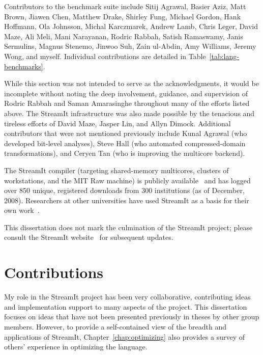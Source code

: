 Contributors to the benchmark suite include Sitij Agrawal, Basier
Aziz, Matt Brown, Jiawen Chen, Matthew Drake, Shirley Fung, Michael
Gordon, Hank Hoffmann, Ola Johnsson, Michal Karczmarek, Andrew Lamb,
Chris Leger, David Maze, Ali Meli, Mani Narayanan, Rodric Rabbah,
Satish Ramaswamy, Janis Sermulins, Magnus Stenemo, Jinwoo Suh, Zain
ul-Abdin, Amy Williams, Jeremy Wong, and myself.  Individual
contributions are detailed in Table~\ref{tab:lang-benchmarks}.


While this section was not intended to serve as the acknowledgments,
it would be incomplete without noting the deep involvement, guidance,
and supervision of Rodric Rabbah and Saman Amarasinghe throughout many
of the efforts listed above.  The StreamIt infrastructure was also
made possible by the tenacious and tireless efforts of David Maze,
Jasper Lin, and Allyn Dimock.  Additional contributors that were not
mentioned previously include Kunal Agrawal (who developed bit-level
analyses), Steve Hall (who automated compressed-domain
transformations), and Ceryen Tan (who is improving the multicore
backend).

The StreamIt compiler (targeting shared-memory multicores, clusters of
workstations, and the MIT Raw machine) is publicly
available~\cite{streamitweb} and has logged over 850 unique,
registered downloads from 300 institutions (as of December, 2008).
Researchers at other universities have used StreamIt as a basis for
their own
work~\cite{mani-permutations,duca-thesis,bit-streaming,ola-techrep,andersson_model_07,won-thesis}.

This dissertation does not mark the culmination of the StreamIt
project; please consult the StreamIt website~\cite{streamitweb} for
subsequent updates.

\section{Contributions}

My role in the StreamIt project has been very collaborative,
contributing ideas and implementation support to many aspects of the
project.  This dissertation focuses on ideas that have not been
presented previously in theses by other group members.  However, to
provide a self-contained view of the breadth and applications of
StreamIt, Chapter~\ref{chap:optimizing} also provides a survey of
others' experience in optimizing the language.

